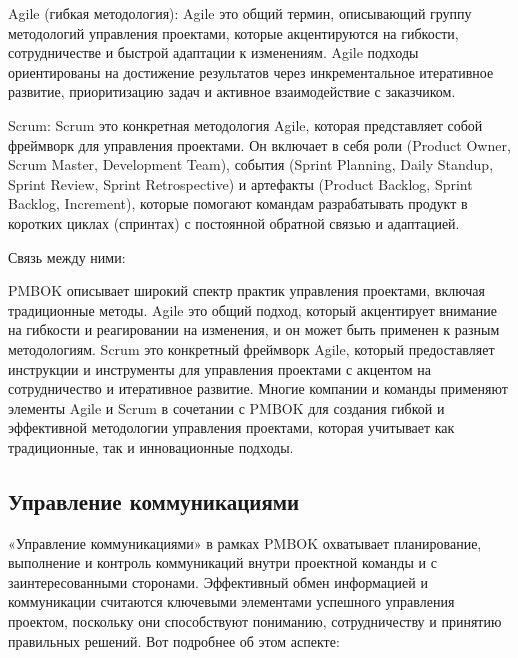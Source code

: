 \documentclass[letterpaper,10pt,russian]{sphinxmanual}
\begin{document}
\sphinxAtStartPar
Agile (гибкая методология):
Agile \sphinxhyphen{} это общий термин, описывающий группу методологий управления проектами, которые акцентируются на гибкости, сотрудничестве и быстрой адаптации к изменениям. Agile подходы ориентированы на достижение результатов через инкрементальное итеративное развитие, приоритизацию задач и активное взаимодействие с заказчиком.

\sphinxAtStartPar
Scrum:
Scrum \sphinxhyphen{} это конкретная методология Agile, которая представляет собой фреймворк для управления проектами. Он включает в себя роли (Product Owner, Scrum Master, Development Team), события (Sprint Planning, Daily Standup, Sprint Review, Sprint Retrospective) и артефакты (Product Backlog, Sprint Backlog, Increment), которые помогают командам разрабатывать продукт в коротких циклах (спринтах) с постоянной обратной связью и адаптацией.

\sphinxAtStartPar
Связь между ними:

\sphinxAtStartPar
PMBOK описывает широкий спектр практик управления проектами, включая традиционные методы.
Agile \sphinxhyphen{} это общий подход, который акцентирует внимание на гибкости и реагировании на изменения, и он может быть применен к разным методологиям.
Scrum \sphinxhyphen{} это конкретный фреймворк Agile, который предоставляет инструкции и инструменты для управления проектами с акцентом на сотрудничество и итеративное развитие.
Многие компании и команды применяют элементы Agile и Scrum в сочетании с PMBOK для создания гибкой и эффективной методологии управления проектами, которая учитывает как традиционные, так и инновационные подходы.


\subsection{Управление коммуникациями}
\label{\detokenize{educational_materials/team_work_on_a_project/content:id8}}
\sphinxAtStartPar
«Управление коммуникациями» в рамках PMBOK охватывает планирование, выполнение и контроль коммуникаций внутри проектной команды и с заинтересованными сторонами. Эффективный обмен информацией и коммуникации считаются ключевыми элементами успешного управления проектом, поскольку они способствуют пониманию, сотрудничеству и принятию правильных решений. Вот подробнее об этом аспекте:
\end{document}
